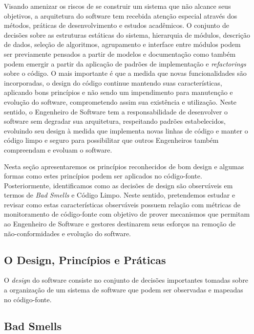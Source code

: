Visando amenizar os riscos de se construir um sistema que não alcance seus objetivos, a arquitetura do software tem recebida atenção especial através dos métodos, práticas de desenvolvimento e estudos acadêmicos. O conjunto de decisões sobre as estruturas estáticas do sistema, hierarquia de módulos, descrição de dados, seleção de algoritmos, agrupamento e interface entre módulos podem ser previamente pensados a partir de modelos e documentação como também podem emergir a partir da aplicação de padrões de implementação e \emph{refactorings} sobre o código. O mais importante é que a medida que novas funcionalidades são incorporadas, o design do código continue mantendo suas características, aplicando bons princípios e não sendo um impendimento para manutenção e evolução do software, comprometendo assim sua existência e utilização. Neste sentido, o Engenheiro de Software tem a responsabilidade de desenvolver o software sem degradar sua arquitetura, respeitando padrões estabelecidos, evoluindo seu design à medida que implementa novas linhas de código e manter o código limpo e seguro para possibilitar que outros Engenheiros também compreendam e evoluam o software.

%

Nesta seção apresentaremos os princípios reconhecidos de bom design e algumas formas como estes princípios podem ser aplicados no código-fonte. Posteriormente, identificamos como as decisões de design são observáveis em termos de \emph{Bad Smells} e Código Limpo. Neste sentido, pretendemos estudar e revisar como estas características observáveis possuem relação com métricas de monitoramento de código-fonte com objetivo de prover mecanismos que permitam ao Engenheiro de Software e gestores destinarem seus esforços na remoção de não-conformidades e evolução do software.

%

\subsection{O Design, Princípios e Práticas}
\label{sec-principles-practises}

O \emph{design} do software consiste no conjunto de decisões importantes tomadas sobre a organização de um sistema de software que podem ser observadas e mapeadas no código-fonte.



\subsection{Bad Smells}
\label{sec-bad-smells}

